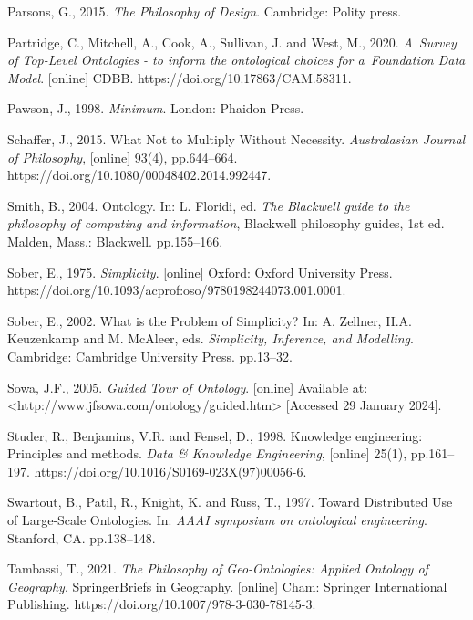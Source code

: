Parsons, G., 2015. \textit{The Philosophy of Design}. Cambridge: Polity press.



Partridge, C., Mitchell, A., Cook, A., Sullivan, J. and West, M., 2020. \textit{A~Survey of Top-Level Ontologies - to inform the ontological choices for a~Foundation Data Model}. [online] CDBB. https://doi.org/10.17863/CAM.58311.



Pawson, J., 1998. \textit{Minimum}. London: Phaidon Press.



Schaffer, J., 2015. What Not to Multiply Without Necessity. \textit{Australasian Journal of Philosophy}, [online] 93(4), pp.644–664. https://doi.org/10.1080/00048402.2014.992447.



Smith, B., 2004. Ontology. In: L. Floridi, ed. \textit{The Blackwell guide to the philosophy of computing and information}, Blackwell philosophy guides, 1st ed. Malden, Mass.: Blackwell. pp.155–166.



Sober, E., 1975. \textit{Simplicity}. [online] Oxford: Oxford University Press. https://doi.org/10.1093/acprof:oso/9780198244073.001.0001.



Sober, E., 2002. What is the Problem of Simplicity? In: A. Zellner, H.A. Keuzenkamp and M. McAleer, eds. \textit{Simplicity, Inference, and Modelling}. Cambridge: Cambridge University Press. pp.13–32.



Sowa, J.F., 2005. \textit{Guided Tour of Ontology}. [online] Available at: {\textless}http://www.jfsowa.com/ontology/guided.htm{\textgreater} [Accessed 29 January 2024].



Studer, R., Benjamins, V.R. and Fensel, D., 1998. Knowledge engineering: Principles and methods. \textit{Data \& Knowledge Engineering}, [online] 25(1), pp.161–197. https://doi.org/10.1016/S0169-023X(97)00056-6.



Swartout, B., Patil, R., Knight, K. and Russ, T., 1997. Toward Distributed Use of Large-Scale Ontologies. In: \textit{AAAI symposium on ontological engineering}. Stanford, CA. pp.138–148.



Tambassi, T., 2021. \textit{The Philosophy of Geo-Ontologies: Applied Ontology of Geography}. SpringerBriefs in Geography. [online] Cham: Springer International Publishing. https://doi.org/10.1007/978-3-030-78145-3.



